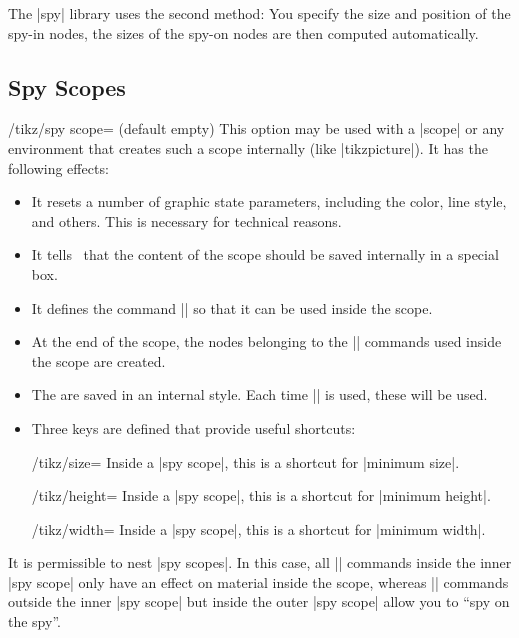 The |spy| library uses the second method: You specify the size and position of
the spy-in nodes, the sizes of the spy-on nodes are then computed
automatically.


\subsection{Spy Scopes}

\begin{key}{/tikz/spy scope= (default \normalfont empty)}
    This option may be used with a |{scope}| or any environment that creates
    such a scope internally (like |{tikzpicture}|). It has the following
    effects:
    \begin{itemize}
        \item It resets a number of graphic state parameters, including the
            color, line style, and others. This is necessary for technical
            reasons.
        \item It tells \tikzname\ that the content of the scope should be saved
            internally in a special box.
        \item It defines the command |\spy| so that it can be used inside the
            scope.
        \item At the end of the scope, the nodes belonging to the |\spy|
            commands used inside the scope are created.
        \item The  are saved in an internal style. Each time
            |\spy| is used, these  will be used.
        \item Three keys are defined that provide useful shortcuts:
            \begin{key}{/tikz/size=}
                Inside a |spy scope|, this is a shortcut for |minimum size|.
            \end{key}
            \begin{key}{/tikz/height=}
                Inside a |spy scope|, this is a shortcut for |minimum height|.
            \end{key}
            \begin{key}{/tikz/width=}
                Inside a |spy scope|, this is a shortcut for |minimum width|.
            \end{key}
    \end{itemize}
    It is permissible to nest |spy scopes|. In this case, all |\spy| commands
    inside the inner |spy scope| only have an effect on material inside the
    scope, whereas |\spy| commands outside the inner |spy scope| but inside the
    outer |spy scope| allow you to ``spy on the spy''.
\begin{codeexample}[preamble={\usetikzlibrary{decorations.fractals,spy}}]
\begin{tikzpicture}
  [spy using outlines={rectangle, red, magnification=5,
                       size=1.5cm, connect spies}]


\end{tikzpicture}
\end{codeexample}
\end{key}
